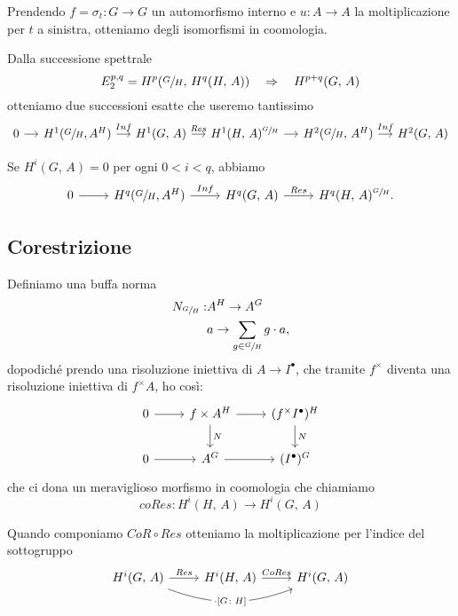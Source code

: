 \documentclass[a4paper]{article}
\begin{document}
	\begin{theorem}
		Prendendo $ f = \sigma_t \colon G \to G $ un automorfismo interno e $ u \colon A \to A $ la moltiplicazione per $ t $ a sinistra, otteniamo degli isomorfismi in coomologia.
	\end{theorem}

	\begin{theorem}
		Dalla successione spettrale \[ E^{p, q}_2 = H^p(\sfrac{G}{H}, \, H^q(H, \, A)) \quad\Rightarrow\quad H^{p+q}(G,\, A) \] otteniamo due successioni esatte che useremo tantissimo
		\[ \begin{tikzcd}[column sep = small]
		0 \rar & H^1(\sfrac{G}{H}, A^H) \rar["Inf"] & H^1(G, \, A) \rar["Res"] & H^1(H, \, A)^{\sfrac{G}{H}} \rar & H^2(\sfrac{G}{H}, \, A^H) \rar["Inf"] & H^2(G, \, A)
		\end{tikzcd} \]
	\end{theorem}

	\begin{theorem}
		Se $ H^i(G, \, A) = 0 $ per ogni $ 0 < i < q $, abbiamo
		\[\begin{tikzcd}
		0 \rar & H^q(\sfrac{G}{H}, A^H) \rar["Inf"] & H^q(G, \, A) \rar["Res"] & H^q(H, \, A)^{\sfrac{G}{H}}.
		\end{tikzcd} \]
	\end{theorem}
	
	\subsection{Corestrizione}
	Definiamo una buffa norma
	\begin{align*}
		N_{\sfrac{G}{H}} : & A^H \to A^G \\
		& a \to \sum_{g \in \sfrac{G}{H} } g\cdot a,
	\end{align*}
	dopodiché prendo una risoluzione iniettiva di $ A \to I^\bullet $, che tramite $ f^\times $ diventa una risoluzione iniettiva di $ f^\times A $, ho così:
	\[ \begin{tikzcd}
	0 \rar & f\times A^H \rar \dar["N"] & (f^\times I^\bullet) ^H \dar["N"] \\
	0 \rar & A^G \rar & (I^\bullet)^G
	\end{tikzcd} \]
	che ci dona un meraviglioso morfismo in coomologia che chiamiamo
	\[ coRes \colon H^i(H,\, A) \to H^i(G, \, A)  \]
	
	\begin{theorem}
		Quando componiamo $ CoR \circ Res $ otteniamo la moltiplicazione per l'indice del sottogruppo
		\[ \begin{tikzcd}
		H^i(G, \, A) \rar["Res"] \arrow["\cdot {\left[G \colon H \right]}" description, bend right = 20]{rr} & H^i(H, \, A)\rar["CoRes"] & H^i(G, \, A)
		\end{tikzcd} \]
	\end{theorem}
\end{document}
